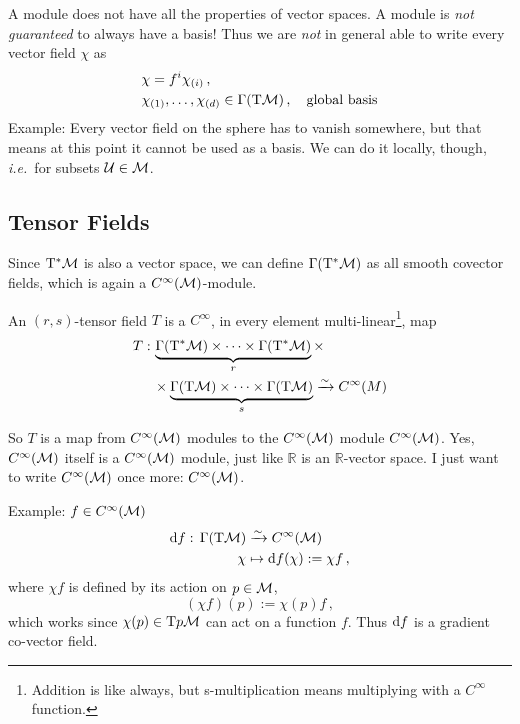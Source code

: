 \documentclass[11pt, a4paper, twocolumn]{article} %
\begin{document}
\begin{center}
\end{center}
A module does not have all the properties of vector spaces.
A module is \textit{not guaranteed} to always have a basis!
Thus we are \textit{not} in general able to write every vector field $\chi$ as
\begin{align}
    &\chi = f^i \chi_{(i)}\,,\\
    &\chi_{(1)}, \ldots, \chi_{(d)} \in \Gamma(\T\M)\,,\quad\text{global basis}
\end{align}
Example: Every vector field on the sphere has to vanish somewhere, 
but that means at this point it cannot be used as a basis.
We can do it locally, though, \textit{i.e.}\ for subsets $\mathcal{U} \in \mathcal{M}$.

\subsection{Tensor Fields}
Since $\T^*\M$ is also a vector space, we can define $\Gamma(\T^*\M)$ as all smooth
covector fields, which is again a $C^\infty(\mathcal{M})$-module.
\begin{defn}
    An $(r,s)$-tensor field $T$ is a $C^\infty$, in every element  multi-linear\footnote{Addition is like always,
    but s-multiplication means multiplying with a $C^\infty$ function.}, map
    \begin{align}
        T:\, & \underbrace{\Gamma(\T^*\M) \times \cdots \times \Gamma(\T^*\M)}_r \times\nonumber\\
        & \times \underbrace{\Gamma(\T\M) \times \cdots \times \Gamma(\T\M)}_s \linearto C^\infty(M)
    \end{align}
\end{defn}
\begin{note}
    So $T$ is a map from $C^\infty(\mathcal{M})$ modules to the $C^\infty(\mathcal{M})$ module $C^\infty(\mathcal{M})$.
    Yes, $C^\infty(\mathcal{M})$ itself is a $C^\infty(\mathcal{M})$ module, just like $\mathbb{R}$ is an
    $\mathbb{R}$-vector space.
    I just want to write $C^\infty(\mathcal{M})$ once more: $C^\infty(\mathcal{M})$.
\end{note}

Example: $f \in C^\infty(\mathcal{M})$
\begin{align}
    \diff f:\,\Gamma(\T\M)&\linearto C^\infty(\M)\\
    \chi &\mapsto \diff f(\chi):= \chi f\,,
\end{align}
where $\chi f$ is defined by its action on $p\in\mathcal{M}$,
\begin{equation}
    (\chi f)(p) := \chi(p) f\,,
\end{equation}
which works since $\chi(p)\in\T{p}\M$ can act on a function $f$.
Thus $\operatorname{d\!} f$ is a gradient co-vector field.
\end{document}
